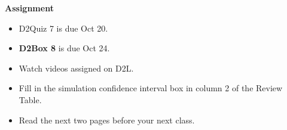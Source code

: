 \noindent
{\bf Assignment} \vspace{-.2in}
\begin{itemize}
 \item  D2Quiz 7 is due Oct 20.
 \item {\bf D2Box 8} is due Oct 24.
\item Watch videos assigned on D2L.
\item Fill in the simulation confidence interval box in column 2 of
  the Review Table.
\item Read the next two pages before your next class.
\end{itemize}

